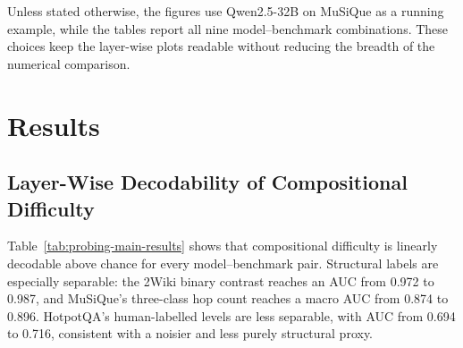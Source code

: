 Unless stated otherwise, the figures use Qwen2.5-32B on MuSiQue as a running
example, while the tables report all nine model--benchmark combinations. These
choices keep the layer-wise plots readable without reducing the breadth of the
numerical comparison.

\section{Results}
\label{sec:probing-results}

\subsection{Layer-Wise Decodability of Compositional Difficulty}
\label{subsec:probing-depth-results}

Table~\ref{tab:probing-main-results} shows that compositional difficulty is
linearly decodable above chance for every model--benchmark pair. Structural
labels are especially separable: the 2Wiki binary contrast reaches an AUC from
0.972 to 0.987, and MuSiQue's three-class hop count reaches a macro AUC from
0.874 to 0.896. HotpotQA's human-labelled levels are less separable, with AUC
from 0.694 to 0.716, consistent with a noisier and less purely structural proxy.

